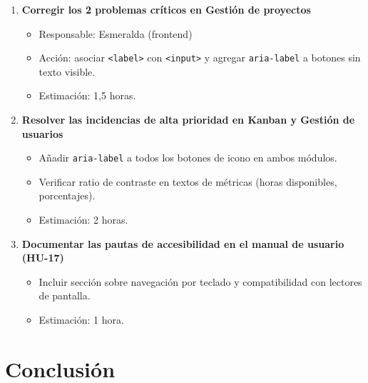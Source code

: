 \documentclass[12pt, a4paper]{article}
\begin{document}
\begin{enumerate}[leftmargin=1.5em, itemsep=6pt]

  \item \textbf{Corregir los 2 problemas críticos en Gestión de proyectos}
  \begin{itemize}[leftmargin=1.2em, topsep=2pt]
    \item Responsable: Esmeralda (frontend)
    \item Acción: asociar \texttt{<label>} con \texttt{<input>} y agregar
          \texttt{aria-label} a botones sin texto visible.
    \item Estimación: 1,5 horas.
  \end{itemize}

  \item \textbf{Resolver las incidencias de alta prioridad en Kanban y Gestión de usuarios}
  \begin{itemize}[leftmargin=1.2em, topsep=2pt]
    \item Añadir \texttt{aria-label} a todos los botones de icono en ambos módulos.
    \item Verificar ratio de contraste en textos de métricas
          (horas disponibles, porcentajes).
    \item Estimación: 2 horas.
  \end{itemize}

  \item \textbf{Documentar las pautas de accesibilidad en el manual de usuario (HU-17)}
  \begin{itemize}[leftmargin=1.2em, topsep=2pt]
    \item Incluir sección sobre navegación por teclado y compatibilidad con lectores
          de pantalla.
    \item Estimación: 1 hora.
  \end{itemize}

\end{enumerate}

\section{Conclusión}
\end{document}
